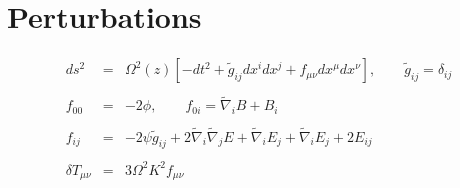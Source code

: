 \documentclass[10pt,letterpaper]{article}
\numberwithin{equation}{section}
\begin{document}
\section{Perturbations}
\begin{eqnarray}
ds^2 &=& \Omega^2(z)\left[ -dt^2 + \tilde g_{ij}dx^i dx^j + f_{\mu\nu}dx^\mu dx^\nu\right],
\qquad\tilde g_{ij} = \delta_{ij}
\\ \nonumber\\
f_{00} &=& -2 \phi,\qquad f_{0i} = \tilde\nabla_i B + B_i
\\ \nonumber\\
f_{ij} &=& -2 \psi \tilde g_{ij} + 2\tilde\nabla_i\tilde\nabla_j E + \tilde\nabla_i E_j
+ \tilde\nabla_i E_j + 2E_{ij}
\\ \nonumber\\
\delta T_{\mu\nu} &=& 3\Omega^2 K^2 f_{\mu\nu}
\end{eqnarray}
%
\end{document}

